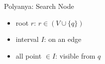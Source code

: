 \documentclass{beamer}
\begin{document}
\begin{frame}{Polyanya: Search Node}

\begin{minipage}{.4\textwidth}
\begin{itemize}
    \item \small root $r$: $r \in (V \cup \{q\})$
    \item \small interval $I$: on an edge
    \item \small all point $\in I$: visible from $q$
\end{itemize}
\end{minipage}%
\begin{minipage}{.6\textwidth}
\begin{adjustbox}{max totalsize={.9\textwidth}{.9\textheight}, right}
\end{adjustbox}
\end{minipage}

\end{frame}



\end{document}
